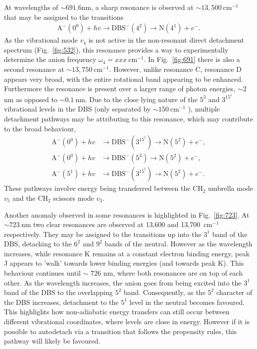 \documentclass[journal=jpcafh,manuscript=article,layout=onecolumn, 12pt]{achemso}
\begin{document}
At wavelengths of $\sim 691.6$nm, a sharp resonance is observed at $\sim13,500~$cm$^{-1}$ that may be assigned to the transitions
\begin{align*}
	\text{A}^-(0^0) +hv \rightarrow \text{DBS}^-(4^2) \rightarrow \text{N}(4^1) + e^-.
\end{align*}
As the vibrational mode $v_4$ is not active in the non-resonant direct detachment spectrum (Fig.~\ref{fig:532}), this resonance provides a way to experimentally determine the anion frequency $\omega_4 = xxx~$cm$^{-1}$. In Fig.~\ref{fig:691} there is also a second resonance at $\sim13,750~$cm$^{-1}$. However, unlike resonance C, resonance D appears very broad, with the entire rotational band appearing to be enhanced. Furthermore the resonance is present over a larger range of photon energies, $\sim 2~$nm as opposed to $\sim 0.1~$nm. Due to the close lying nature of the $5^3$ and $3^15^1$ vibrational levels in the DBS (only separated by $\sim 150~$cm$^{-1}$ ), multiple detachment pathways may be attributing to this resonance, which may contribute to the broad behaviour,
\begin{align*}
	\text{A}^-(0^0) +hv &\rightarrow \text{DBS}^-(3^15^1) \rightarrow \text{N}(5^2) + e^-,\\
	\text{A}^-(0^0) +hv &\rightarrow \text{DBS}^-(5^3) \rightarrow \text{N}(5^2) + e^-,\\
	\text{A}^-(5^1) +hv &\rightarrow \text{DBS}^-(3^15^1) \rightarrow \text{N}(5^2) + e^-.
\end{align*}
These pathways involve energy being transferred between the CH$_2$ umbrella mode $v_5$ and the CH$_2$ scissors mode $v_3$.

Another anomaly observed in some resonances is highlighted in Fig.~\ref{fig:723}. At $\sim 723~$nm two clear resonances are observed at 13,600 and 13,700~cm$^{-1}$ respectively. They may be assigned to the transitions up into the $3^1$ band of the DBS, detaching to the $6^2$ and $9^2$ bands of the neutral. However as the wavelength increases, while resonance K remains at a constant electron binding energy, peak J appears to 'walk' towards lower binding energies (and towards peak K). This behaviour continues until $\sim$ 726 nm, where both resonances are on top of each other.  As the wavelength increases, the anion goes from being excited into the $3^1$ band of the DBS to the overlapping $5^2$ band. Consequently, as the $5^2$ character of the DBS increases, detachment to the $5^1$ level in the neutral becomes favoured. This highlights how non-adiabatic energy transfers can still occur between different vibrational coordinates, where levels are close in energy. However if it is possible to autodetach via a transition that follows the propensity rules, this pathway will likely be favoured.
\end{document}
